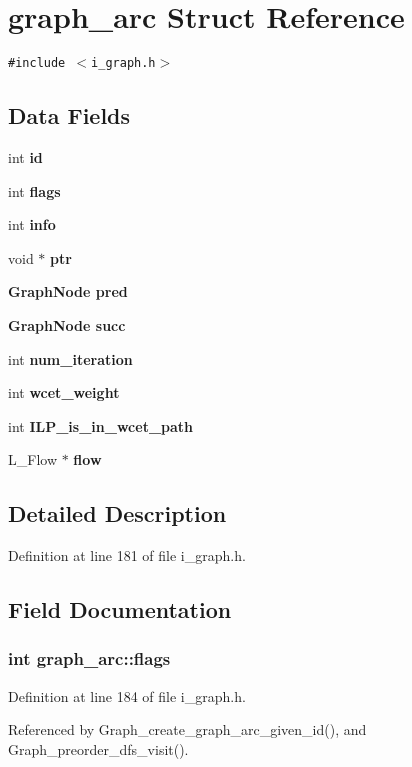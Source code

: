 \section{graph\_\-arc Struct Reference}
\label{structgraph__arc}
{\tt \#include $<$i\_\-graph.h$>$}

\subsection*{Data Fields}
\begin{CompactItemize}
\item 
int \bf{id}
\item 
int \bf{flags}
\item 
int \bf{info}
\item 
void $\ast$ \bf{ptr}
\item 
\bf{Graph\-Node} \bf{pred}
\item 
\bf{Graph\-Node} \bf{succ}
\item 
int \bf{num\_\-iteration}
\item 
int \bf{wcet\_\-weight}
\item 
int \bf{ILP\_\-is\_\-in\_\-wcet\_\-path}
\item 
L\_\-Flow $\ast$ \bf{flow}
\end{CompactItemize}


\subsection{Detailed Description}




Definition at line 181 of file i\_\-graph.h.

\subsection{Field Documentation}
\subsubsection{\setlength{\rightskip}{0pt plus 5cm}int \bf{graph\_\-arc::flags}}\label{structgraph__arc_aa69405bf723089b696d1cfbe4e775ce}




Definition at line 184 of file i\_\-graph.h.

Referenced by Graph\_\-create\_\-graph\_\-arc\_\-given\_\-id(), and Graph\_\-preorder\_\-dfs\_\-visit().
